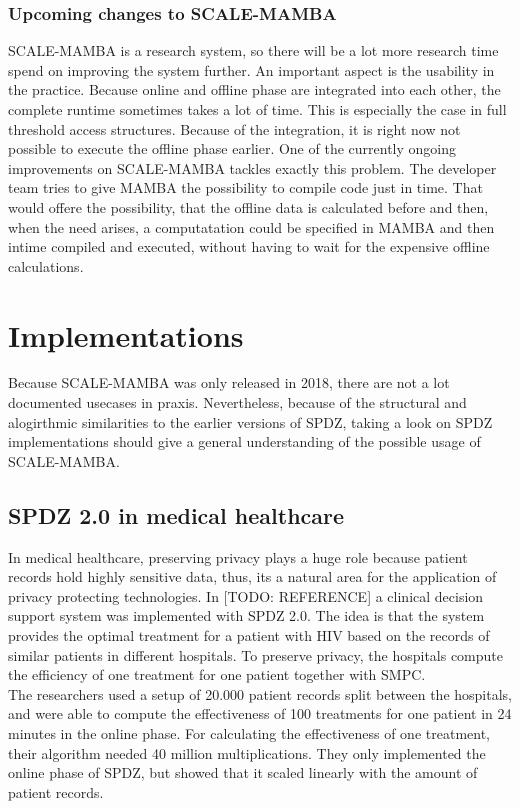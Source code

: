 \documentclass[english,runningheads,a4paper]{llncs}[2018/03/10]
\begin{document}
\subsubsection{Upcoming changes to SCALE-MAMBA}
SCALE-MAMBA is a research system, so there will be a lot more research time spend on improving the system further. An important aspect is the usability in the practice. Because online and offline phase are integrated into each other, the complete runtime sometimes takes a lot of time. This is especially the case in full threshold access structures. Because of the integration, it is right now not possible to execute the offline phase earlier. One of the currently ongoing improvements on SCALE-MAMBA tackles exactly this problem. The developer team tries to give MAMBA the possibility to compile code just in time. That would offere the possibility, that the offline data is calculated before and then, when the need arises, a computatation could be specified in MAMBA and then intime compiled and executed, without having to wait for the expensive offline calculations.\\

\section{Implementations}
Because SCALE-MAMBA was only released in 2018, there are not a lot documented usecases in praxis. Nevertheless, because of the structural and alogirthmic similarities to the earlier versions of SPDZ, taking a look on SPDZ implementations should give a general understanding of the possible usage of SCALE-MAMBA.\\

\subsection{SPDZ 2.0 in medical healthcare}
In medical healthcare, preserving privacy plays a huge role because patient records hold highly sensitive data, thus, its a natural area for the application of privacy protecting technologies. In [TODO: REFERENCE] a clinical decision support system was implemented with SPDZ 2.0. The idea is that the system provides the optimal treatment for a patient with HIV based on the  records of similar patients in different hospitals. To preserve privacy, the hospitals compute the efficiency of one treatment for one patient together with SMPC.\\
The researchers used a setup of 20.000 patient records split between the hospitals, and were able to compute the effectiveness of 100 treatments for one patient in 24 minutes in the online phase. For calculating the effectiveness of one treatment, their algorithm needed 40 million multiplications. They only implemented the online phase of SPDZ, but showed that it scaled linearly with the amount of patient records. 
\end{document}
